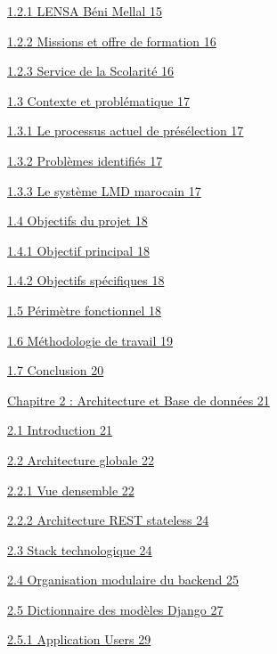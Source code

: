 \documentclass[
]{article}
\begin{document}
\protect\hyperlink{lensa-buxe9ni-mellal}{1.2.1 L\textquotesingle ENSA
Béni Mellal 15}

\protect\hyperlink{missions-et-offre-de-formation}{1.2.2 Missions et
offre de formation 16}

\protect\hyperlink{service-de-la-scolarituxe9}{1.2.3 Service de la
Scolarité 16}

\protect\hyperlink{contexte-et-probluxe9matique}{1.3 Contexte et
problématique 17}

\protect\hyperlink{le-processus-actuel-de-pruxe9suxe9lection}{1.3.1 Le
processus actuel de présélection 17}

\protect\hyperlink{probluxe8mes-identifiuxe9s}{1.3.2 Problèmes
identifiés 17}

\protect\hyperlink{le-systuxe8me-lmd-marocain}{1.3.3 Le système LMD
marocain 17}

\protect\hyperlink{objectifs-du-projet}{1.4 Objectifs du projet 18}

\protect\hyperlink{objectif-principal}{1.4.1 Objectif principal 18}

\protect\hyperlink{objectifs-spuxe9cifiques}{1.4.2 Objectifs spécifiques
18}

\protect\hyperlink{puxe9rimuxe8tre-fonctionnel}{1.5 Périmètre
fonctionnel 18}

\protect\hyperlink{muxe9thodologie-de-travail}{1.6 Méthodologie de
travail 19}

\protect\hyperlink{conclusion}{1.7 Conclusion 20}

\protect\hyperlink{chapitre-2-architecture-et-base-de-donnuxe9es}{Chapitre
2 : Architecture et Base de données 21}

\protect\hyperlink{introduction-1}{2.1 Introduction 21}

\protect\hyperlink{architecture-globale}{2.2 Architecture globale 22}

\protect\hyperlink{vue-densemble}{2.2.1 Vue d\textquotesingle ensemble
22}

\protect\hyperlink{architecture-rest-stateless}{2.2.2 Architecture REST
stateless 24}

\protect\hyperlink{stack-technologique}{2.3 Stack technologique 24}

\protect\hyperlink{organisation-modulaire-du-backend}{2.4 Organisation
modulaire du backend 25}

\protect\hyperlink{dictionnaire-des-moduxe8les-django}{2.5 Dictionnaire
des modèles Django 27}

\protect\hyperlink{application-users}{2.5.1 Application Users 29}
\end{document}
